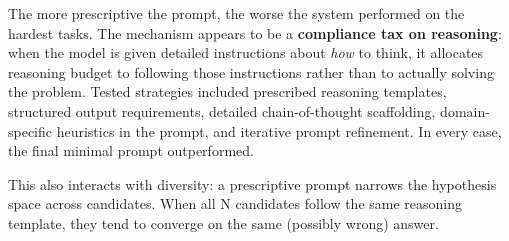 \documentclass[10pt]{article}
\begin{document}
The more prescriptive the prompt, the worse the system performed on the
hardest tasks. The mechanism appears to be a \textbf{compliance tax on
reasoning}: when the model is given detailed instructions about
\emph{how} to think, it allocates reasoning budget to following those
instructions rather than to actually solving the problem. Tested
strategies included prescribed reasoning templates, structured output
requirements, detailed chain-of-thought scaffolding, domain-specific
heuristics in the prompt, and iterative prompt refinement. In every
case, the final minimal prompt outperformed.

This also interacts with diversity: a prescriptive prompt narrows the
hypothesis space across candidates. When all N candidates follow the
same reasoning template, they tend to converge on the same (possibly
wrong) answer.



\end{document}
